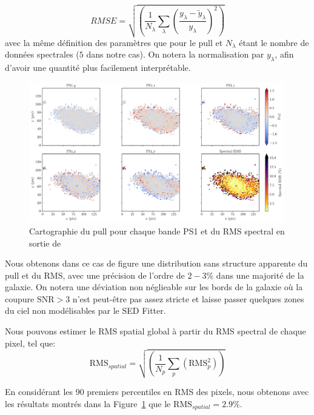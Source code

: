 \documentclass[../main/main.tex]{subfiles}
\begin{document}
\begin{equation}
  \label{eq:rms}
  RMSE = \sqrt{\left(\frac{1}{N_{\lambda}}\sum_{\lambda}\left(\frac{y_{\lambda} - \widetilde{y}_{\lambda}}{y_{\lambda}}\right)^{2} \right)}
\end{equation}
avec la même définition des paramètres que pour le pull et $N_{\lambda}$
étant le nombre de données spectrales ($5$ dans notre cas). On notera la
normalisation par $y_{\lambda}$, afin d'avoir une quantité plus
facilement interprétable.

\begin{figure}[ht]
  \centering
  \includegraphics[width=0.99\textwidth]{../figures/05_sedfit/cigale_pullrms_ZTF18accrorf.pdf}
  \caption[Cartographie du pull et du RMS en sortie de
  \cigale]{Cartographie du pull pour chaque bande PS1 et du RMS spectral en sortie de \cigale}
  \label{fig:cigale_pullrms}
\end{figure}

Nous obtenons dans ce cas de figure une distribution sans structure
apparente du pull et du RMS, avec une précision de l'ordre de $2-3$\%
dans une majorité de la galaxie. On notera une déviation non néglieable
sur les bords de la galaxie où la coupure $\text{SNR}>3$ n'est peut-être pas
assez stricte et laisse passer quelques zones du ciel non modélisables
par le SED Fitter.

Nous pouvons estimer le RMS spatial global à partir du RMS spectral de
chaque pixel, tel que:
\begin{equation}
\text{RMS}_{spatial} =\sqrt{\left(\frac{1}{N_{p}}\sum\limits_{p} \left(\text{RMS}^{2}_{p}\right)\right)}
\end{equation}

En considérant les $90$ premiers percentiles en RMS des pixels, nous obtenons avec les résultats montrés dans la
Figure~\ref{fig:cigale_pullrms} que le $\text{RMS}_{spatial}=2.9\%$.
\clearpage
\end{document}
